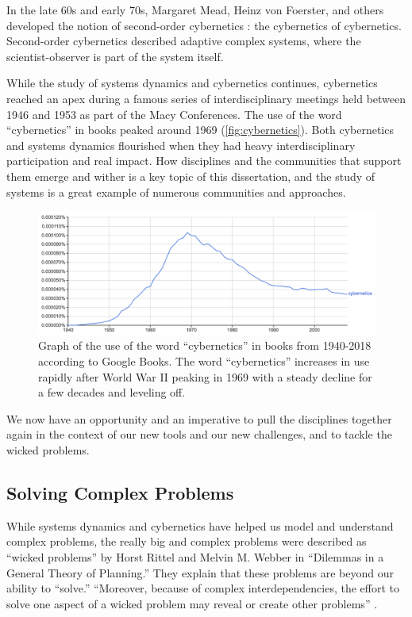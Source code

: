 In the late 60s and early 70s, Margaret Mead, Heinz von Foerster, and others developed the notion of second-order cybernetics \cite{glanville2002second}: the cybernetics of cybernetics. Second-order cybernetics described adaptive complex systems, where the scientist-observer is part of the system itself.

While the study of systems dynamics and cybernetics continues, cybernetics reached an apex during a famous series of interdisciplinary meetings held between 1946 and 1953 as part of the Macy Conferences. The use of the word ``cybernetics'' in books peaked around 1969 (\autoref{fig:cybernetics}). Both cybernetics and systems dynamics flourished when they had heavy interdisciplinary participation and real impact. How disciplines and the communities that support them emerge and wither is a key topic of this dissertation, and the study of systems is a great example of numerous communities and approaches.

\begin{figure}[h]
 \centering
 \includegraphics[width=1\textwidth]{pictures/cyberneticsuse}
 \caption[Graph of the use of the word ``cybernetics'' in books from 1940-2018 according to Google Books.]{Graph of the use of the word ``cybernetics'' in books from 1940-2018 according to Google Books. The word ``cybernetics'' increases in use rapidly after World War II peaking in 1969 with a steady decline for a few decades and leveling off.}
 \label{fig:cybernetics}
\end{figure}

We now have an opportunity and an imperative to pull the disciplines together again in the context of our new tools and our new challenges, and to tackle the wicked problems.

\subsection{Solving Complex Problems}

While systems dynamics and cybernetics have helped us model and understand complex problems, the really big and complex problems were described as ``wicked problems'' by Horst Rittel and Melvin M. Webber in ``Dilemmas in a General Theory of Planning.'' \cite{rittel_dilemmas_1973} They explain that these problems are beyond our ability to ``solve.'' ``Moreover, because of complex interdependencies, the effort to solve one aspect of a wicked problem may reveal or create other problems'' \cite{rittel_dilemmas_1973}.


